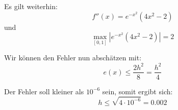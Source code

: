 \documentclass[11pt]{article}
\theoremstyle{plain}
\theoremstyle{definition}
\renewcommand{\a}{\"{a}}
\renewcommand{\o}{\"{o}}
\begin{document}
Es gilt weiterhin:
\begin{equation}
f''(x) = e^{-x^2}(4x^2-2)
\end{equation}
und
\begin{equation}
\max_{[0,1]} |e^{-x^2}(4x^2-2)| = 2
\end{equation}

Wir k\o nnen den Fehler nun absch\a tzen mit:
\begin{equation}
e(x) \leq \frac{2h^2}{8} = \frac{h^2}{4}
\end{equation}

Der Fehler soll kleiner als $10^{-6}$ sein, somit ergibt sich:
\begin{equation}
h \leq \sqrt{4\cdot 10^{-6}} = 0.002
\end{equation}
\end{document}
